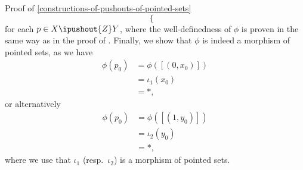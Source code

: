 \begin{Proof}{Proof of \cref{constructions-of-pushouts-of-pointed-sets}}
\[\begin{cases}
        \end{cases}
    \]%
    for each $p\in X\ipushout{Z}Y$, where the well-definedness of $\phi$ is proven in the same way as in the proof of . Finally, we show that $\phi$ is indeed a morphism of pointed sets, as we have
    \begin{align*}
        \phi(p_{0}) &= \phi([(0,x_{0})])\\
                    &= \iota_{1}(x_{0})\\
                    &= *,
    \end{align*}
    or alternatively
    \begin{align*}
        \phi(p_{0}) &= \phi([(1,y_{0})])\\
                    &= \iota_{2}(y_{0})\\
                    &= *,
    \end{align*}
    where we use that $\iota_{1}$ (resp.\ $\iota_{2}$) is a morphism of pointed sets.
\end{Proof}
